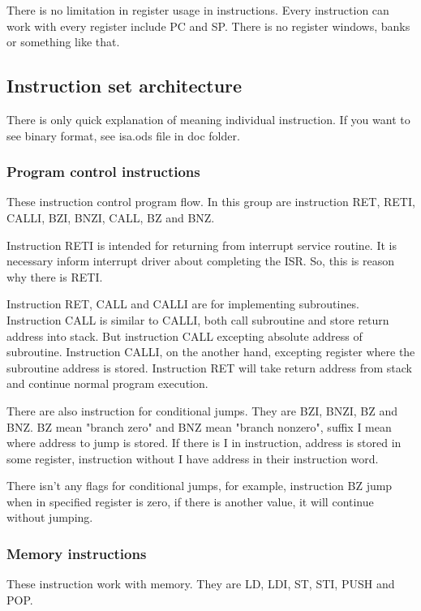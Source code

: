There is no limitation in register usage in instructions. Every
instruction can work with every register include PC and SP. There is
no register windows, banks or something like that.

\subsection{Instruction set architecture}

There is only quick explanation of meaning individual instruction. If you want
to see binary format, see isa.ods file in doc folder.

\subsubsection{Program control instructions}

These instruction control program flow. In this group are instruction RET,
RETI, CALLI, BZI, BNZI, CALL, BZ and BNZ.

Instruction RETI is intended for returning from interrupt service routine. It
is necessary inform interrupt driver about completing the ISR. So, this is
reason why there is RETI.

Instruction RET, CALL and CALLI are for implementing subroutines. Instruction
CALL is similar to CALLI, both call subroutine and store return address into
stack. But instruction CALL excepting absolute address of subroutine.
Instruction CALLI, on the another hand, excepting register where the subroutine
address is stored. Instruction RET will take return address from stack and
continue normal program execution.

There are also instruction for conditional jumps. They are BZI, BNZI, BZ and
BNZ. BZ mean "branch zero" and BNZ mean "branch nonzero", suffix I mean where
address to jump is stored. If there is I in instruction, address is stored in
some register, instruction without I have address in their instruction word.

There isn't any flags for conditional jumps, for example, instruction BZ jump
when in specified register is zero, if there is another value, it will continue
without jumping.

\subsubsection{Memory instructions}

These instruction work with memory. They are LD, LDI, ST, STI, PUSH and POP.

